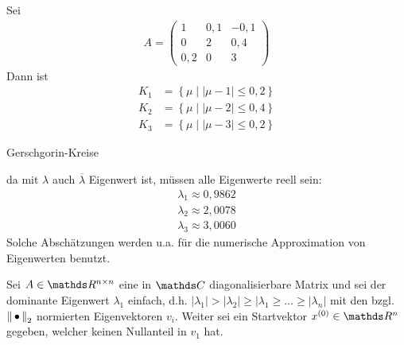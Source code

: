   \begin{Bspe}
    Sei 
    \begin{gather*}
      A=
      \begin{pmatrix}
        1 & 0,1 & -0,1\\
        0 & 2 & 0,4 \\
        0,2 & 0 & 3
      \end{pmatrix}
    \end{gather*}
    Dann ist
    \begin{align*}
      K_1 &= \left\{ \mu \mid |\mu-1|\leq 0,2 \right\} \\
      K_2 &= \left\{ \mu \mid |\mu-2|\leq 0,4 \right\} \\
      K_3 &= \left\{ \mu \mid |\mu-3|\leq 0,2 \right\}
    \end{align*}
    \begin{image}{Gerschgorin-Kreise}
\end{image}\label{im8.1.3}
da mit $\lambda$ auch $\overline{\lambda}$ Eigenwert ist,
müssen alle Eigenwerte reell sein:
\begin{align*}
  \lambda_1 \approx 0,9862 \\
  \lambda_2 \approx 2,0078 \\
  \lambda_3 \approx 3,0060
\end{align*}
Solche Abschätzungen werden u.a. für die numerische
Approximation von Eigenwerten benutzt.
\end{Bspe}


\label{8.2.1}
Sei $A\in\R^{n\times n}$ eine  in $\C$
diagonalisierbare Matrix und 
sei der dominante Eigenwert $\lambda_1$ einfach,
d.h. 
$|\lambda_1|>|\lambda_2|\geq |\lambda_1\geq \ldots\geq |\lambda_n|$
mit den bzgl. $\left\| \,\bullet\, \right\|_2$ normierten Eigenvektoren $v_i$.
Weiter sei ein Startvektor $x^{(0)}\in\R^n$ gegeben,
welcher 
keinen Nullanteil in $v_1$ hat.


